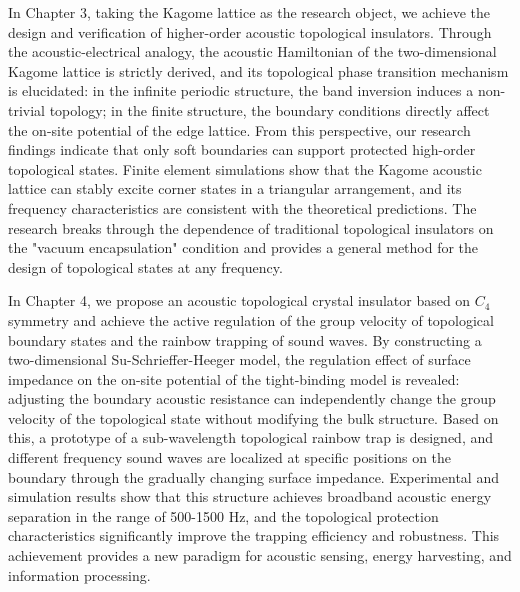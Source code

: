\documentclass[
    anonymous,              %
    type = doctor,
  ]{njuthesis}
\begin{document}
\begin{abstract*}
  In Chapter 3, taking the Kagome lattice as the research object, we achieve the design and verification of higher-order acoustic topological insulators. Through the acoustic-electrical analogy, the acoustic Hamiltonian of the two-dimensional Kagome lattice is strictly derived, and its topological phase transition mechanism is elucidated: in the infinite periodic structure, the band inversion induces a non-trivial topology; in the finite structure, the boundary conditions directly affect the on-site potential of the edge lattice. From this perspective, our research findings indicate that only soft boundaries can support protected high-order topological states. Finite element simulations show that the Kagome acoustic lattice can stably excite corner states in a triangular arrangement, and its frequency characteristics are consistent with the theoretical predictions. The research breaks through the dependence of traditional topological insulators on the "vacuum encapsulation" condition and provides a general method for the design of topological states at any frequency.
  
  In Chapter 4, we propose an acoustic topological crystal insulator based on $C_4$ symmetry and achieve the active regulation of the group velocity of topological boundary states and the rainbow trapping of sound waves. By constructing a two-dimensional Su-Schrieffer-Heeger model, the regulation effect of surface impedance on the on-site potential of the tight-binding model is revealed: adjusting the boundary acoustic resistance can independently change the group velocity of the topological state without modifying the bulk structure. Based on this, a prototype of a sub-wavelength topological rainbow trap is designed, and different frequency sound waves are localized at specific positions on the boundary through the gradually changing surface impedance. Experimental and simulation results show that this structure achieves broadband acoustic energy separation in the range of 500-1500 Hz, and the topological protection characteristics significantly improve the trapping efficiency and robustness. This achievement provides a new paradigm for acoustic sensing, energy harvesting, and information processing.
  

\end{abstract*}
\end{document}
